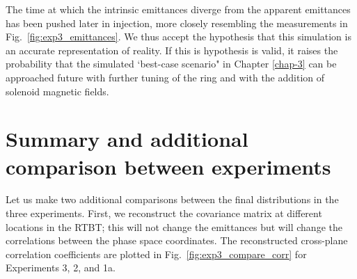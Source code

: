 %
The time at which the intrinsic emittances diverge from the apparent emittances has been pushed later in injection, more closely resembling the measurements in Fig.~\ref{fig:exp3_emittances}. We thus accept the hypothesis that this simulation is an accurate representation of reality. If this is hypothesis is valid, it raises the probability that the simulated `best-case scenario" in Chapter \ref{chap-3} can be approached future with further tuning of the ring and with the addition of solenoid magnetic fields.



\section{Summary and additional comparison between experiments}

Let us make two additional comparisons between the final distributions in the three experiments. First, we reconstruct the covariance matrix at different locations in the RTBT; this will not change the emittances but will change the correlations between the phase space coordinates. The reconstructed cross-plane correlation coefficients are plotted in Fig.~\ref{fig:exp3_compare_corr} for Experiments 3, 2, and 1a.
%
